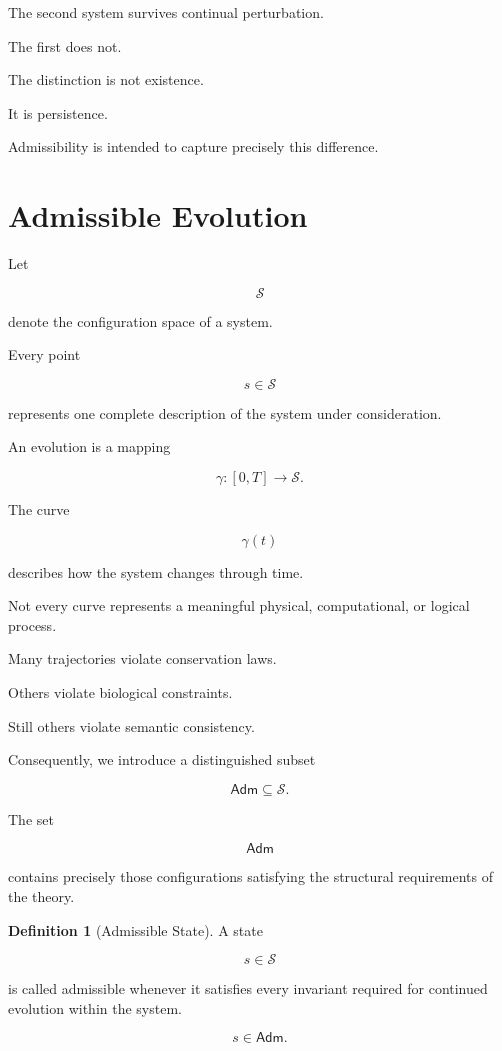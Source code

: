 \documentclass[11pt,oneside]{book}
\numberwithin{equation}{chapter}
\theoremstyle{definition}
\newtheorem{definition}{Definition}[chapter]
\theoremstyle{plain}
\newcommand{\State}{\mathcal{S}}
\newcommand{\Adm}{\mathsf{Adm}}
\begin{document}
The second system survives continual perturbation.

The first does not.

The distinction is not existence.

It is persistence.

Admissibility is intended to capture precisely this difference.

\section{Admissible Evolution}

Let

\[
\State
\]

denote the configuration space of a system.

Every point

\[
s \in \State
\]

represents one complete description of the system under consideration.

An evolution is a mapping

\[
\gamma :
[0,T]
\rightarrow
\State.
\]

The curve

\[
\gamma(t)
\]

describes how the system changes through time.

Not every curve represents a meaningful physical, computational, or logical
process.

Many trajectories violate conservation laws.

Others violate biological constraints.

Still others violate semantic consistency.

Consequently, we introduce a distinguished subset

\[
\Adm
\subseteq
\State.
\]

The set

\[
\Adm
\]

contains precisely those configurations satisfying the structural
requirements of the theory.

\begin{definition}[Admissible State]

A state

\[
s \in \State
\]

is called admissible whenever it satisfies every invariant required for
continued evolution within the system.

\[
s \in \Adm.
\]

\end{definition}
\end{document}
